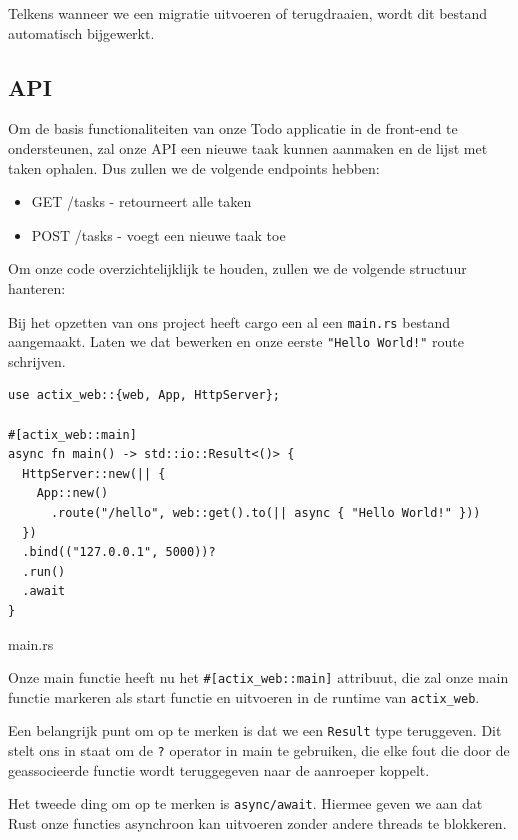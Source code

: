 Telkens wanneer we een migratie uitvoeren of terugdraaien, wordt dit bestand automatisch bijgewerkt.

\clearpage

\subsection{API}

Om de basis functionaliteiten van onze Todo applicatie in de front-end te ondersteunen, zal onze API
een nieuwe taak kunnen aanmaken en de lijst met taken ophalen. Dus zullen we de volgende endpoints
hebben:
\begin{itemize}
  \item GET /tasks - retourneert alle taken
  \item POST /tasks - voegt een nieuwe taak toe
\end{itemize}


Om onze code overzichtelijklijk te houden, zullen we de volgende structuur hanteren:

Bij het opzetten van ons project heeft cargo een al een \texttt{main.rs} bestand
aangemaakt. Laten we dat bewerken en onze eerste \texttt{"Hello World!"} route schrijven.

\begin{listing}[h]
\begin{verbatim}
use actix_web::{web, App, HttpServer};

#[actix_web::main]
async fn main() -> std::io::Result<()> {
  HttpServer::new(|| {
    App::new()
      .route("/hello", web::get().to(|| async { "Hello World!" }))
  })
  .bind(("127.0.0.1", 5000))?
  .run()
  .await
}
\end{verbatim}
\caption{main.rs}
\end{listing}
\clearpage

Onze main functie heeft nu het \texttt{#[actix_web::main]} attribuut, die zal onze main
functie markeren als start functie en uitvoeren in de runtime van \texttt{actix_web}.

Een belangrijk punt om op te merken is dat we een \texttt{Result} type teruggeven. Dit
stelt ons in staat om de \texttt{?} operator in main te gebruiken, die elke fout die door
de geassocieerde functie wordt teruggegeven naar de aanroeper koppelt.

Het tweede ding om op te merken is \texttt{async/await}. Hiermee geven we aan dat Rust
onze functies asynchroon kan uitvoeren zonder andere threads te blokkeren.

